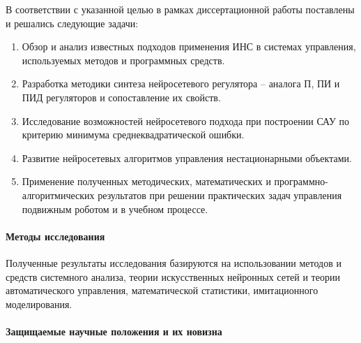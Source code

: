 В соответствии с указанной целью в рамках диссертационной работы
поставлены и решались следующие задачи:
\begin{enumerate}
\item
Обзор и анализ известных подходов применения ИНС в системах
управления, используемых методов и программных средств.

\item
Разработка методики синтеза нейросетевого регулятора – аналога П, ПИ и
ПИД регуляторов и сопоставление их свойств.

\item
Исследование возможностей нейросетевого подхода при построении САУ по
критерию минимума среднеквадратической ошибки.

\item 
Развитие нейросетевых алгоритмов управления нестационарными объектами.

\item
Применение полученных методических, математических и
программно-алгоритмических результатов при решении практических задач
управления подвижным роботом и в учебном процессе.
\end{enumerate}

\paragraph{Методы исследования}
Полученные результаты исследования базируются на использовании методов
и средств системного анализа, теории искусственных нейронных сетей и
теории автоматического управления, математической статистики,
имитационного моделирования.

\paragraph{Защищаемые научные положения и их новизна}


